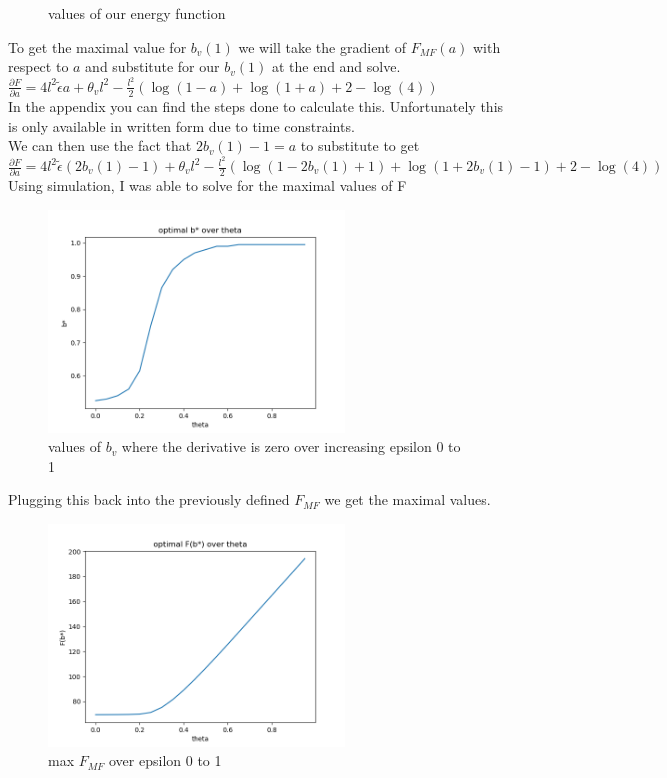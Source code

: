 \documentclass[12pt]{article}
\begin{document}
\begin{section}{9.1}
\begin{figure}[H]
	  \caption{values of our energy function}
  \end{figure}
To get the maximal value for $b_v(1)$ we will take the gradient of $ F_{MF}(a)$ with respect to $a$ and substitute for our $b_v(1)$ at the end and solve.
\\
$\frac{\partial F}{\partial a} = 4l^2\tilde{\epsilon}a+\theta_vl^2 - \frac{l^2}{2}(\log(1-a)+\log(1+a)+2-\log(4))$
\\
In the appendix you can find the steps done to calculate this. Unfortunately this is only available in written form due to time constraints.
\\
We can then use the fact that $2b_v(1)-1= a$ to substitute to get $\frac{\partial F}{\partial a} = 4l^2\tilde{\epsilon}(2b_v(1)-1)+\theta_vl^2 - \frac{l^2}{2}(\log(1-2b_v(1)+1)+\log(1+2b_v(1)-1)+2-\log(4))$
\\
Using simulation, I was able to solve for the maximal values of F
\begin{figure}[H]
	\includegraphics[width=0.7\textwidth]{optimalb.png}
	\caption{values of $b_v$ where the derivative is zero over increasing epsilon 0 to 1}
\end{figure}
Plugging this back into the previously defined $F_{MF}$ we get the maximal values.
\begin{figure}[H]
	\includegraphics[width=0.7\textwidth]{optimalEnergys.png}
	\caption{max $F_{MF}$ over epsilon 0 to 1}
\end{figure}

\end{section}
\end{document}
